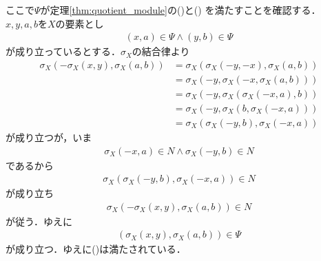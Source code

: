 	ここで$\Psi$が定理\ref{thm:quotient_module}の()と()
	を満たすことを確認する．
	$x,y,a,b$を$X$の要素とし
	\begin{align}
		(x,a) \in \Psi \wedge (y,b) \in \Psi
	\end{align}
	が成り立っているとする．$\sigma_X$の結合律より
	\begin{align}
		\sigma_X\left(-\sigma_X(x,y),\sigma_X(a,b)\right)
		&= \sigma_X\left(\sigma_X(-y,-x),\sigma_X(a,b)\right) \\
		&= \sigma_X\left(-y,\sigma_X\left(-x,\sigma_X(a,b)\right)\right) \\
		&= \sigma_X\left(-y,\sigma_X\left(\sigma_X(-x,a),b\right)\right) \\
		&= \sigma_X\left(-y,\sigma_X\left(b,\sigma_X(-x,a)\right)\right) \\
		&= \sigma_X\left(\sigma_X(-y,b),\sigma_X(-x,a)\right)
	\end{align}
	が成り立つが，いま
	\begin{align}
		\sigma_X(-x,a) \in N \wedge \sigma_X(-y,b) \in N
	\end{align}
	であるから
	\begin{align}
		\sigma_X\left(\sigma_X(-y,b),\sigma_X(-x,a)\right) \in N
	\end{align}
	が成り立ち
	\begin{align}
		\sigma_X\left(-\sigma_X(x,y),\sigma_X(a,b)\right) \in N
	\end{align}
	が従う．ゆえに
	\begin{align}
		\left(\sigma_X(x,y),\sigma_X(a,b)\right) \in \Psi
	\end{align}
	が成り立つ．ゆえに()は満たされている．
	
